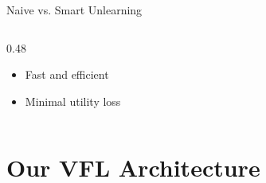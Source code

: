 \documentclass[aspectratio=169, 11pt]{beamer}
\begin{document}
\begin{frame}{Naive vs. Smart Unlearning}
\begin{columns}[T]
\begin{column}{0.48\textwidth}
            \begin{itemize}
                \item[\faCheck] Fast and efficient
                \item[\faCheck] Minimal utility loss
            \end{itemize}
        \end{column}
    \end{columns}
\end{frame}

\section{Our VFL Architecture}
\end{document}
